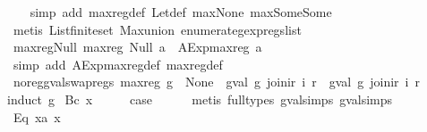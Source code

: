 \begin{isabellebody}
%
\isadelimproof
\ \ %
\endisadelimproof
%
\isatagproof
{}\isamarkupfalse%
\ {\isacharparenleft}simp\ add{\isacharcolon}\ max{\isacharunderscore}reg{\isacharunderscore}def\ Let{\isacharunderscore}def\ max{\isacharunderscore}None\ max{\isacharunderscore}Some{\isacharunderscore}Some{\isacharparenright}\isanewline
\ \ \isamarkupfalse%
\ {\isacharparenleft}metis\ List{\isachardot}finite{\isacharunderscore}set\ Max{\isachardot}union\ enumerate{\isacharunderscore}gexp{\isacharunderscore}regs{\isacharunderscore}list{\isacharparenright}%
\endisatagproof
{\isafoldproof}%
%
\isadelimproof
\isanewline
%
\endisadelimproof
\isanewline
{}\isamarkupfalse%
\ max{\isacharunderscore}reg{\isacharunderscore}Null{\isacharcolon}\ {\isachardoublequoteopen}max{\isacharunderscore}reg\ {\isacharparenleft}Null\ a{\isacharparenright}\ {\isacharequal}\ AExp{\isachardot}max{\isacharunderscore}reg\ a{\isachardoublequoteclose}\isanewline
%
\isadelimproof
\ \ %
\endisadelimproof
%
\isatagproof
{}\isamarkupfalse%
\ {\isacharparenleft}simp\ add{\isacharcolon}\ AExp{\isachardot}max{\isacharunderscore}reg{\isacharunderscore}def\ max{\isacharunderscore}reg{\isacharunderscore}def{\isacharparenright}%
\endisatagproof
{\isafoldproof}%
%
\isadelimproof
\isanewline
%
\endisadelimproof
\isanewline
{}\isamarkupfalse%
\ no{\isacharunderscore}reg{\isacharunderscore}gval{\isacharunderscore}swap{\isacharunderscore}regs{\isacharcolon}\ {\isachardoublequoteopen}max{\isacharunderscore}reg\ g\ {\isacharequal}\ None\ {\isasymLongrightarrow}\ gval\ g\ {\isacharparenleft}join{\isacharunderscore}ir\ i\ r{\isacharparenright}\ {\isacharequal}\ gval\ g\ {\isacharparenleft}join{\isacharunderscore}ir\ i\ r{\isacharprime}{\isacharparenright}{\isachardoublequoteclose}\isanewline
%
\isadelimproof
%
\endisadelimproof
%
\isatagproof
{}\isamarkupfalse%
{\isacharparenleft}induct\ g{\isacharparenright}\isanewline
{}\isamarkupfalse%
\ {\isacharparenleft}Bc\ x{\isacharparenright}\isanewline
\ \ \isamarkupfalse%
\ \isamarkupfalse%
\ {\isacharquery}case\isanewline
\ \ \ \ \isamarkupfalse%
\ {\isacharparenleft}metis\ {\isacharparenleft}full{\isacharunderscore}types{\isacharparenright}\ gval{\isachardot}simps{\isacharparenleft}{}{\isacharparenright}\ gval{\isachardot}simps{\isacharparenleft}{}{\isacharparenright}{\isacharparenright}\isanewline
{}\isamarkupfalse%
\isanewline
\ \ \isamarkupfalse%
\ {\isacharparenleft}Eq\ x{}a\ x{}{\isacharparenright}\isanewline

\end{isabellebody}
